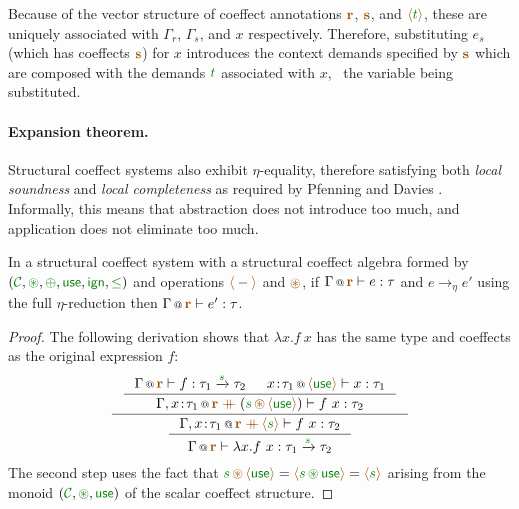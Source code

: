 \noindent
Because of the vector structure of coeffect annotations $\aclrd{\textbf{r}}$,
$\aclrd{\textbf{s}}$, and $\alift{\cclrd{t}}$, these are uniquely associated with $\Gamma_r$,
$\Gamma_s$, and $x$ respectively. Therefore, substituting $e_s$ (which has coeffects
$\aclrd{\textbf{s}}$) for $x$ introduces the context demands specified by $\aclrd{\textbf{s}}$
which are composed with the demands $\cclrd{t}$ associated with $x$, \ie~the variable being
substituted.

\paragraph{Expansion theorem.}
Structural coeffect systems also exhibit $\eta$-equality, therefore satisfying both
\emph{local soundness} and \emph{local completeness} as required by Pfenning and Davies
\cite{logic-modal-reconstruction}. Informally, this means that abstraction does not introduce
too much, and application does not eliminate too much.

\begin{theorem}
In a structural coeffect system with a structural coeffect algebra formed by
$(\C, \cseq, \cpar, \cunit, \czero, \cleq)$ and operations $\alift{-}$ and $\aseq$,
if $\coctx{\Gamma}{\aclrd{\textbf{r}}} \vdash e : \tau$
and $e \rightarrow_{\eta} e'$ using the full $\eta$-reduction then
$\coctx{\Gamma}{\aclrd{\textbf{r}}} \vdash e' : \tau$.
\end{theorem}
\begin{proof}
The following derivation shows that $\lambda x.f~x$ has the same type and coeffects as
the original expression $f$:
\begin{equation*}
\inference
  { \inference
    { \coctx{\Gamma}{\aclrd{\textbf{r}}} \vdash f : \tau_1 \xrightarrow{\cclrd{s}} \tau_2 &
      \coctx{x\!:\!\tau_1}{\alift{\cunit}} \vdash x:\tau_1 }
    { \coctx{\Gamma, x\!:\!\tau_1}{\aclrd{\textbf{r}} \;\atimes\;(\cclrd{s}\,\aseq\,\alift{\cunit}) } \vdash f~x : \tau_2 } }
  { \inference
    { \coctx{\Gamma, x\!:\!\tau_1}{\aclrd{\textbf{r}} \;\atimes\,\alift{\cclrd{s}} } \vdash f~x : \tau_2 }
    { \coctx{\Gamma}{ \aclrd{\textbf{r}} } \vdash \lambda x.f~x : \tau_1 \xrightarrow{\cclrd{s}} \tau_2 } }
\end{equation*}
%
The second step uses the fact that
$\cclrd{s} \,\aseq\, \alift{\cunit} = \alift{\cclrd{s} \,\cseq\, \cunit} = \alift{\cclrd{s}}$
arising from the monoid $(\C, \cseq, \cunit)$ of the scalar coeffect structure.
\end{proof}


